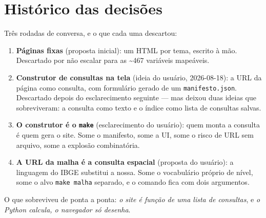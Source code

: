 \documentclass[11pt]{article}
\begin{document}
\section{Histórico das decisões}
\label{sec:org0bad18a}

Três rodadas de conversa, e o que cada uma descartou:

\begin{enumerate}
\item \textbf{Páginas fixas} (proposta inicial): um HTML por tema, escrito à mão.
Descartado por não escalar para as \textasciitilde{}467 variáveis mapeáveis.
\item \textbf{Construtor de consultas na tela} (ideia do usuário, 2026-08-18): a URL
da página como consulta, com formulário gerado de um \texttt{manifesto.json}.
Descartado depois do esclarecimento seguinte — mas deixou duas ideias que
sobreviveram: a consulta como texto e o índice como lista de consultas
salvas.
\item \textbf{O construtor é o \texttt{make}} (esclarecimento do usuário): quem monta a
consulta é quem gera o site. Some o manifesto, some a UI, some o risco de
URL sem arquivo, some a explosão combinatória.
\item \textbf{A URL da malha é a consulta espacial} (proposta do usuário): a linguagem
do IBGE substitui a nossa. Some o vocabulário próprio de nível, some o
alvo \texttt{make malha} separado, e o comando fica com dois argumentos.
\end{enumerate}

O que sobreviveu de ponta a ponta: \emph{o site é função de uma lista de
consultas}, e \emph{o Python calcula, o navegador só desenha}.
\end{document}
